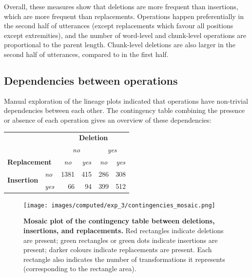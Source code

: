 Overall, these measures show that deletions are more frequent than
insertions, which are more frequent than replacements. Operations happen
preferentially in the second half of utterances (except replacements
which favour all positions except extremities), and the number of
word-level and chunk-level operations are proportional to the parent
length. Chunk-level deletions are also larger in the second half of
utterances, compared to in the first half.

\subsection{Dependencies between
operations}\label{dependencies-between-operations}

Manual exploration of the lineage plots indicated that operations have
non-trivial dependencies between each other. The contingency table
combining the presence or absence of each operation gives an overview of
these dependencies:

\begin{center}
  \begin{tabular}{llrrrr}
    \toprule
     & & \multicolumn{4}{c}{\textbf{Deletion}} \\
    \cmidrule(l){3-6}
     & & \multicolumn{2}{c}{\emph{no}} & \multicolumn{2}{c}{\emph{yes}} \\
    \cmidrule(lr){3-4} \cmidrule(l){5-6}
    \multicolumn{2}{l}{\textbf{Replacement}} & \multicolumn{1}{c}{\emph{no}} & \multicolumn{1}{c}{\emph{yes}} & \multicolumn{1}{c}{\emph{no}} & \multicolumn{1}{c}{\emph{yes}} \\
    \midrule
    \multirow{2}{*}{\textbf{Insertion}} & \emph{no} & 1381 & 415 & 286 & 308 \\
     & \emph{yes} & 66 & 94 & 399 & 512 \\
    \bottomrule
  \end{tabular}
\end{center}

\begin{figure}[!ht]
  \centering
  \texttt{[image: images/computed/exp\_3/contingencies\_mosaic.png]}
  \caption[Mosaic plot of the contingency table between deletions, insertions, and replacements]{
  \textbf{Mosaic plot of the contingency table between deletions, insertions, and replacements.}
  Red rectangles indicate deletions are present;
  green rectangles or green dots indicate insertions are present;
  darker colours indicate replacements are present.
  Each rectangle also indicates the number of transformations it represents (corresponding to the rectangle area).
  }
  \label{fig:gistr-contingencies}
\end{figure}

